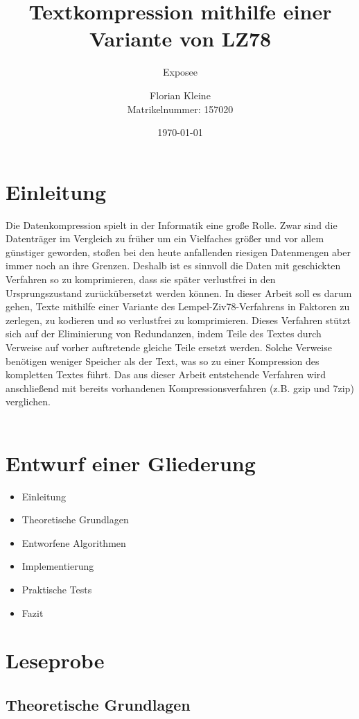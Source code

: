 \documentclass[a4paper,11pt]{scrartcl}%
\title{\vspace{2,5cm}Textkompression mithilfe einer Variante von LZ78}
\subtitle{Exposee}
\author{Florian Kleine\\Matrikelnummer: 157020}
\date{\today}
\theoremstyle{change}
\theoremstyle{nonumberplain}
\theoremstyle{change}
\theoremstyle{nonumberplain}
\theoremstyle{change}
\theoremstyle{nonumberplain}
\begin{document}
\maketitle
\thispagestyle{empty}
\newpage
\tableofcontents
\newpage
\newpage
\section{Einleitung}

Die Datenkompression spielt in der Informatik eine große Rolle. Zwar sind die Datenträger im Vergleich zu früher um ein Vielfaches größer und vor allem günstiger geworden, stoßen bei den heute anfallenden riesigen Datenmengen aber immer noch an ihre Grenzen. Deshalb ist es sinnvoll die Daten mit geschickten Verfahren so zu komprimieren, dass sie später verlustfrei in den Ursprungszustand zurückübersetzt werden können.
In dieser Arbeit soll es darum gehen, Texte mithilfe einer Variante des Lempel-Ziv78-Verfahrens in Faktoren zu zerlegen, zu kodieren und so verlustfrei zu komprimieren. Dieses Verfahren stützt sich auf der Eliminierung von Redundanzen, indem Teile des Textes durch Verweise auf vorher auftretende gleiche Teile ersetzt werden. Solche Verweise benötigen weniger Speicher als der Text, was so zu einer Kompression des kompletten Textes führt.
Das aus dieser Arbeit entstehende Verfahren wird anschließend mit bereits vorhandenen Kompressionsverfahren (z.B. gzip und 7zip) verglichen.\\\\

\section{Entwurf einer Gliederung}

	\begin{itemize}
		\item Einleitung
		\item Theoretische Grundlagen
		\item Entworfene Algorithmen
		\item Implementierung
		\item Praktische Tests
		\item Fazit
	\end{itemize}
\newpage	
\section{Leseprobe}
	\subsection{Theoretische Grundlagen}
	
\end{document}

